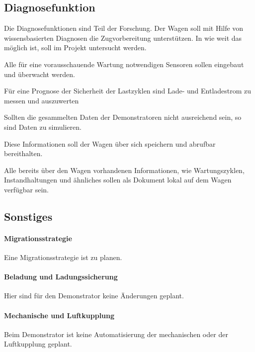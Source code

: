 \subsection{Diagnosefunktion}
Die Diagnosefunktionen sind Teil der Forschung. Der Wagen soll mit Hilfe von wissensbasierten Diagnosen die Zugvorbereitung unterstützen. In wie weit das möglich ist, soll im Projekt untersucht werden. 
\begin{feat}
Alle für eine vorausschauende Wartung notwendigen Sensoren sollen eingebaut und überwacht werden.
\end{feat}
\begin{feat}
Für eine Prognose der Sicherheit der Lastzyklen sind Lade- und Entladestrom zu messen und auszuwerten
\end{feat}
\begin{rem}
Sollten die gesammelten Daten der \gls{Demonstrator}en nicht ausreichend sein, so sind Daten zu simulieren.
\end{rem}
\begin{feat}
Diese Informationen soll der Wagen über sich speichern und abrufbar bereithalten.
\end{feat}
\begin{feat}
Alle bereits über den Wagen vorhandenen Informationen, wie Wartungszyklen, Instandhaltungen und ähnliches sollen als Dokument lokal auf dem Wagen  verfügbar sein.
\end{feat}

\subsection{Sonstiges}
\paragraph{Migrationsstrategie}
\begin{feat}
Eine Migrationsstrategie ist zu planen.
\end{feat}
\paragraph{Beladung und Ladungssicherung}
Hier sind für den \gls{Demonstrator} keine Änderungen geplant.
\paragraph{Mechanische und Luftkupplung}
Beim \gls{Demonstrator} ist keine Automatisierung der mechanischen oder der Luftkupplung geplant.
